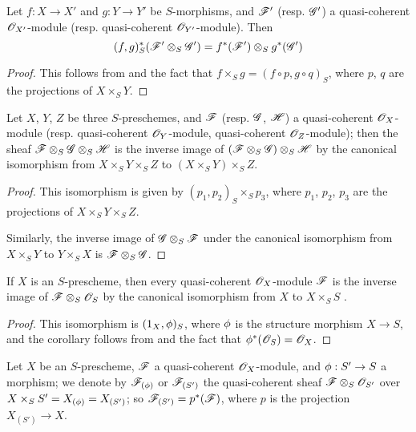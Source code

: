 \begin{cor}[9.1.5]
\label{1.9.1.5}
Let $f:X\to X'$ and $g:Y\to Y'$ be
$S$-morphisms, and $\mathscr{F}'$ (resp. $\mathscr{G}'$) a quasi-coherent
$\mathscr{O}_{X'}$-module (resp. quasi-coherent $\mathscr{O}_{Y'}$-module). Then
\[
  (f,g)^*_S(\mathscr{F}'\otimes_S\mathscr{G}')=f^*(\mathscr{F}')\otimes_S g^*(\mathscr{G}')
\]
\end{cor}

\begin{proof}
\label{proof-1.9.1.5}
This follows from  and the fact that $f\times_S g=(f\circ p, g\circ q)_S$,
where $p$, $q$ are the projections of $X\times_S Y$.
\end{proof}

\begin{cor}[9.1.6]
\label{1.9.1.6}
Let $X$, $Y$, $Z$ be three $S$-preschemes, and $\mathscr{F}$ (resp. $\mathscr{G}$, $\mathscr{H}$) a
quasi-coherent $\mathscr{O}_X$-module (resp. quasi-coherent $\mathscr{O}_Y$-module, quasi-coherent
$\mathscr{O}_Z$-module); then the sheaf $\mathscr{F}\otimes_S\mathscr{G}\otimes_S\mathscr{H}$ is the inverse image
of $(\mathscr{F}\otimes_S\mathscr{G})\otimes_S\mathscr{H}$ by the canonical isomorphism from
$X\times_S Y\times_S Z$ to $(X\times_S Y)\times_S Z$.
\end{cor}

\begin{proof}
\label{proof-1.9.16}
This isomorphism is given by $(p_1,p_2)_S\times_S p_3$, where $p_1$, $p_2$, $p_3$
are the projections of $X\times_S Y\times_S Z$.

Similarly, the inverse image of $\mathscr{G}\otimes_S\mathscr{F}$ under the canonical isomorphism from
$X\times_S Y$ to $Y\times_S X$ is $\mathscr{F}\otimes_S\mathscr{G}$.
\end{proof}

\begin{cor}[9.1.7]
\label{1.9.1.7}
If $X$ is an $S$-prescheme, then every quasi-coherent $\mathscr{O}_X$-module $\mathscr{F}$ is the inverse
image of $\mathscr{F}\otimes_S\mathscr{O}_S$ by the canonical isomorphism from $X$ to $X\times_S S$
.
\end{cor}

\begin{proof}
\label{proof-1.9.1.7}
This isomorphism is $(1_X,\phi)_S$, where $\phi$ is the structure morphism
$X\to S$, and the corollary follows from  and the fact that
$\phi^*(\mathscr{O}_S)=\mathscr{O}_X$.
\end{proof}

\begin{env}[9.1.8]
\label{1.9.1.8}
Let $X$ be an $S$-prescheme, $\mathscr{F}$ a quasi-coherent
$\mathscr{O}_X$-module, and $\vphi:S'\to S$ a morphism; we denote by
$\mathscr{F}_{(\phi)}$ or $\mathscr{F}_{(S')}$ the quasi-coherent sheaf
$\mathscr{F}\otimes_S\mathscr{O}_{S'}$ over $X\times_S S'=X_{(\phi)}=X_{(S')}$; so
$\mathscr{F}_{(S')}=p^*(\mathscr{F})$, where $p$ is the projection $X_{(S')}\to X$.
\end{env}

